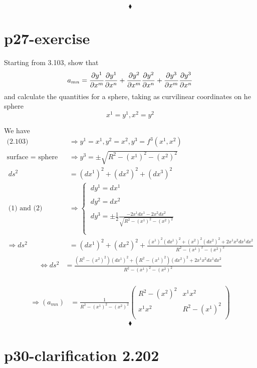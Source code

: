 $$\blacklozenge$$
\newpage


\section{p27-exercise}

\begin{tcolorbox}
Starting from 3.103, show that $$a_{mn} = \pdv{y^1}{x^m}\pdv{y^1}{x^n}+\pdv{y^2}{x^m}\pdv{y^2}{x^n}+\pdv{y^3}{x^m}\pdv{y^3}{x^n}$$ and calculate the quantities for a sphere, taking as curvilinear coordinates on he sphere $$x^1 = y^1 , x^2 = y^2$$
\end{tcolorbox}
We have
\begin{align}
\text{(2.103)}\quad &\Rightarrow y^1 = x^1 , y^2 = x^2, y^3 = f^3(x^1,x^2)\\
\text{surface = sphere}\quad &\Rightarrow y^3 = \pm \sqrt{R^2 -(x^1)^2-(x^2)^2}\\
\ ds^2 &= (dx^1)^2+(dx^2)^2+(dx^3)^2\\
\ \text{(1) and (2)}\quad& \Rightarrow \left\{ \begin{array}{c} 
\ dy^1 = dx^1\\\\
\ dy^2 = dx^2\\\\
\ dy^3 = \pm \frac{1}{2} \frac{-2x^1dx^1 - 2x^2dx^2}{\sqrt{R^2 -(x^1)^2-(x^2)^2}}\\\\
\end{array}
\right.\\
\Rightarrow ds^2 & = (dx^1)^2 +  (dx^2)^2 + \frac{(x^1)^2(dx^1)^2 + (x^2)^2(dx^2)^2  + 2 x^1x^2dx^1dx^2}{R^2 -(x^1)^2-(x^2)^2}
\end{align}
\begin{align}
\Leftrightarrow ds^2 & = \frac{(R^2 - (x^2)^2) (dx^1)^2 + (R^2 -(x^1)^2) (dx^2)^2  + 2 x^1x^2dx^1dx^2}{R^2 -(x^1)^2-(x^2)^2}
\end{align}\\
\begin{align}
\Rightarrow (a_{mn}) &= \frac{1}{R^2 -(x^1)^2-(x^2)^2}\begin{pmatrix}
 R^2 - (x^2)^2&x^1x^2 \\
x^1x^2 & R^2 - (x^1)^2 \\
\end{pmatrix}
\end{align}
$$\blacklozenge$$
\newpage


\section{p30-clarification 2.202}

